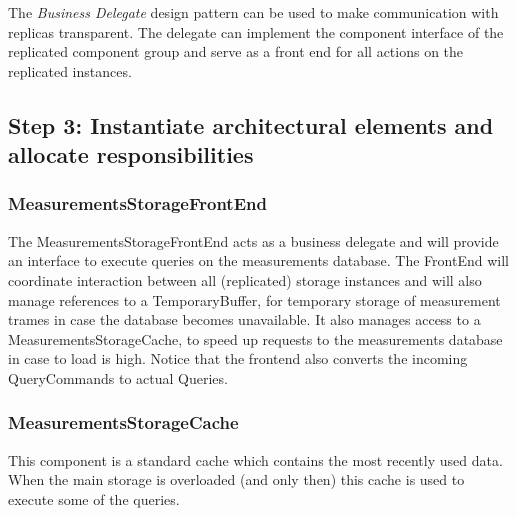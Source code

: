 \npar The \emph{Business Delegate} design pattern
\citep[see][p.~292]{Buschmann:07} can be used to make communication with
replicas transparent. The delegate can implement the component interface of the
replicated component group and serve as a front end for all actions on the
replicated instances.

\subsection{Step 3: Instantiate architectural elements and allocate responsibilities}
\label{add:it4/elements}


\subsubsection{MeasurementsStorageFrontEnd}

\npar The MeasurementsStorageFrontEnd acts as a business delegate and will
provide an interface to execute queries on the measurements database. The
FrontEnd will coordinate interaction between all (replicated) storage instances
and will also manage references to a TemporaryBuffer, for temporary storage of
measurement trames in case the database becomes unavailable. It also manages
access to a MeasurementsStorageCache, to speed up requests to the measurements
database in case to load is high. Notice that the frontend also converts the
incoming QueryCommands to actual Queries.

\subsubsection{MeasurementsStorageCache}

\npar This component is a standard cache which contains the most recently used
data. When the main storage is overloaded (and only then) this cache is used to
execute some of the queries. 

